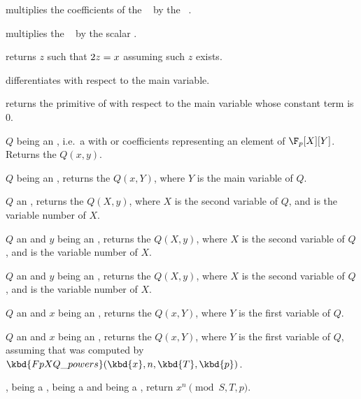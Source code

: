  multiplies the coefficients of the
~ by the ~.

 multiplies the ~
by the scalar .

 returns $z$ such that $2\*z = x$
assuming such $z$ exists.

 differentiates  with respect to
the main variable.

 returns the primitive of  with
respect to the main variable whose constant term is $0$.

 $Q$ being an ,
i.e.~a  with  or  coefficients representing an
element of $\F_p[X][Y]$. Returns the  $Q(x,y)$.

 $Q$ being an , returns the
 $Q(x,Y)$, where $Y$ is the main variable of $Q$.

 $Q$ an , returns
the  $Q(X,y)$, where $X$ is the second variable of $Q$, and 
is the variable number of $X$.

 $Q$ an 
and $y$ being an , returns the  $Q(X,y)$, where $X$ is the
second variable of $Q$, and  is the variable number of $X$.

 $Q$ an 
and $y$ being an , returns the  $Q(X,y)$, where $X$ is the
second variable of $Q$, and  is the variable number of $X$.

 $Q$ an  and
$x$ being an , returns the  $Q(x,Y)$, where $Y$ is the
first variable of $Q$.

 $Q$ an  and
$x$ being an , returns the  $Q(x,Y)$, where $Y$ is the
first variable of $Q$, assuming that  was computed by
$\kbd{FpXQ\_powers}(\kbd{x}, n, \kbd{T}, \kbd{p})$.

,  being a
,  being a  and  being a ,
return $x^n \pmod{S,T,p}$.

